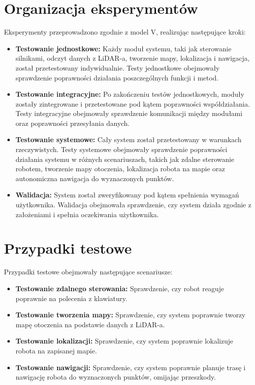 \documentclass[a4paper,twoside,12pt]{book}
\begin{document}
\section{Organizacja eksperymentów}
Eksperymenty przeprowadzono zgodnie z model V, realizując następujące kroki:
\begin{itemize}
	\item \textbf{Testowanie jednostkowe:} Każdy moduł systemu, taki jak sterowanie silnikami, odczyt danych z LiDAR-a, tworzenie mapy, lokalizacja i nawigacja, został przetestowany indywidualnie. Testy jednostkowe obejmowały sprawdzenie poprawności działania poszczególnych funkcji i metod.
	\item \textbf{Testowanie integracyjne:} Po zakończeniu testów jednostkowych, moduły zostały zintegrowane i przetestowane pod kątem poprawności współdziałania. Testy integracyjne obejmowały sprawdzenie komunikacji między modułami oraz poprawności przesyłania danych.
	\item \textbf{Testowanie systemowe:} Cały system został przetestowany w warunkach rzeczywistych. Testy systemowe obejmowały sprawdzenie poprawności działania systemu w różnych scenariuszach, takich jak zdalne sterowanie robotem, tworzenie mapy otoczenia, lokalizacja robota na mapie oraz autonomiczna nawigacja do wyznaczonych punktów.
	\item \textbf{Walidacja:} System został zweryfikowany pod kątem spełnienia wymagań użytkownika. Walidacja obejmowała sprawdzenie, czy system działa zgodnie z założeniami i spełnia oczekiwania użytkownika.
\end{itemize}

\section{Przypadki testowe}
Przypadki testowe obejmowały następujące scenariusze:
\begin{itemize}
	\item \textbf{Testowanie zdalnego sterowania:} Sprawdzenie, czy robot reaguje poprawnie na polecenia z klawiatury.
	\item \textbf{Testowanie tworzenia mapy:} Sprawdzenie, czy system poprawnie tworzy mapę otoczenia na podstawie danych z LiDAR-a.
	\item \textbf{Testowanie lokalizacji:} Sprawdzenie, czy system poprawnie lokalizuje robota na zapisanej mapie.
	\item \textbf{Testowanie nawigacji:} Sprawdzenie, czy system poprawnie planuje trasę i nawigację robota do wyznaczonych punktów, omijając przeszkody.
\end{itemize}
\end{document}
